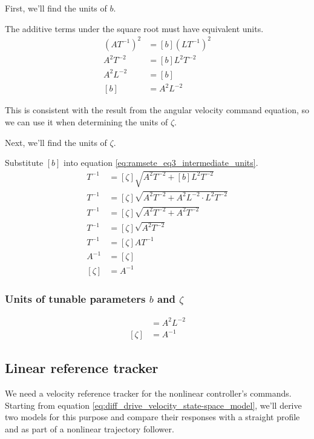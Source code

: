 First, we'll find the units of $b$.

The additive terms under the square root must have equivalent units.
\begin{align*}
  (A T^{-1})^{2} &= [b] (L T^{-1})^{2} \\
  A^{2} T^{-2} &= [b] L^{2} T^{-2} \\
  A^{2} L^{-2} &= [b] \\
  [b] &= A^{2} L^{-2}
\end{align*}

This is consistent with the result from the angular velocity command equation,
so we can use it when determining the units of $\zeta$.

Next, we'll find the units of $\zeta$.

Substitute $[b]$ into equation \eqref{eq:ramsete_eq3_intermediate_units}.
\begin{align*}
  T^{-1} &= [\zeta] \sqrt{A^{2} T^{-2} + [b] L^{2} T^{-2}} \\
  T^{-1} &= [\zeta] \sqrt{A^{2} T^{-2} + A^{2} L^{-2} \cdot L^{2} T^{-2}} \\
  T^{-1} &= [\zeta] \sqrt{A^{2} T^{-2} + A^{2} T^{-2}} \\
  T^{-1} &= [\zeta] \sqrt{A^{2} T^{-2}} \\
  T^{-1} &= [\zeta] A T^{-1} \\
  A^{-1} &= [\zeta] \\
  [\zeta] &= A^{-1}
\end{align*}

\subsubsection{Units of tunable parameters $b$ and $\zeta$}
\begin{align}
  [b] &= A^{2} L^{-2} \\
  [\zeta] &= A^{-1}
\end{align}

\subsection{Linear reference tracker}
\label{subsec:linear_reference_tracker}

We need a velocity \gls{reference} tracker for the nonlinear \gls{controller}'s
commands. Starting from equation
\eqref{eq:diff_drive_velocity_state-space_model}, we'll derive two \glspl{model}
for this purpose and compare their responses with a straight profile and as part
of a nonlinear trajectory follower.

